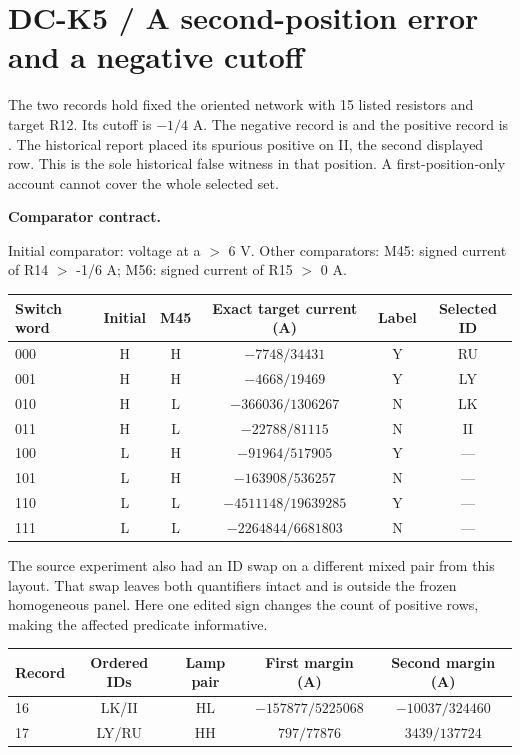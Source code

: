 \documentclass[12pt,letterpaper]{article}
\newcommand{\code}[1]{\texttt{\detokenize{#1}}}
\newcommand{\reading}[2]{\par\smallskip\textsf{\color{accent}\bfseries #1}\enspace #2\par}
\begin{document}
\clearpage\section{DC-K5 / A second-position error and a negative cutoff}

The two records hold fixed the oriented network with 15 listed resistors and target R12. Its cutoff is $-1/4$ A. The negative record is \code{scope-16} and the positive record is \code{scope-17}. The historical report placed its spurious positive on II, the second displayed row. This is the sole historical false witness in that position. A first-position-only account cannot cover the whole selected set.

\reading{Comparator contract.}{} Initial comparator: voltage at a $>$ 6 V. Other comparators: M45: signed current of R14 $>$ -1/6 A; M56: signed current of R15 $>$ 0 A.

\begin{center}\small\begin{tabular}{@{}lccccc@{}}\toprule
Switch word & Initial & M45 & Exact target current (A) & Label & Selected ID\\\midrule
000 & H & H & $-7748/34431$ & Y & RU\\
001 & H & H & $-4668/19469$ & Y & LY\\
010 & H & L & $-366036/1306267$ & N & LK\\
011 & H & L & $-22788/81115$ & N & II\\
100 & L & H & $-91964/517905$ & Y & ---\\
101 & L & H & $-163908/536257$ & N & ---\\
110 & L & L & $-4511148/19639285$ & Y & ---\\
111 & L & L & $-2264844/6681803$ & N & ---\\\bottomrule\end{tabular}\end{center}

The source experiment also had an ID swap on a different mixed pair from this layout. That swap leaves both quantifiers intact and is outside the frozen homogeneous panel. Here one edited sign changes the count of positive rows, making the affected predicate informative.

\begin{center}\small\begin{tabular}{@{}lcccc@{}}\toprule
Record & Ordered IDs & Lamp pair & First margin (A) & Second margin (A)\\\midrule
16 & LK/II & HL & $-157877/5225068$ & $-10037/324460$\\
17 & LY/RU & HH & $797/77876$ & $3439/137724$\\\bottomrule\end{tabular}\end{center}
\end{document}
